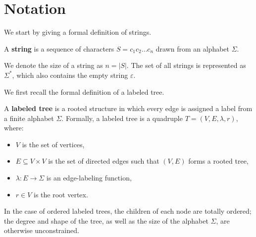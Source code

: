 \section{Notation} \label{sec:notation}

We start by giving a formal definition of strings.
\begin{definition}[String]\label{def:string}
    A \textbf{string} is a sequence of characters $S = c_1c_2\ldots c_n$ drawn from an alphabet $\Sigma$.
\end{definition}
We denote the size of a string as $n = |S|$.
The set of all strings is represented as $\Sigma^*$, which also contains the empty string $\varepsilon$.



We first recall the formal definition of a labeled tree.

\begin{definition} \label{def:labeled_tree}
    A \textbf{labeled tree} is a rooted structure in which every edge is assigned a label from a finite alphabet $\Sigma$. Formally, a labeled tree is a quadruple $T = (V, E, \lambda, r)$, where:
    \begin{itemize}
        \item $V$ is the set of vertices,
        \item $E \subseteq V \times V$ is the set of directed edges such that $(V,E)$ forms a rooted tree,
        \item $\lambda : E \to \Sigma$ is an edge-labeling function,
        \item $r \in V$ is the root vertex.
    \end{itemize}
\end{definition}

In the case of ordered labeled trees, the children of each node are totally ordered; the degree and shape of the tree, as well as the size of the alphabet $\Sigma$, are otherwise unconstrained.

